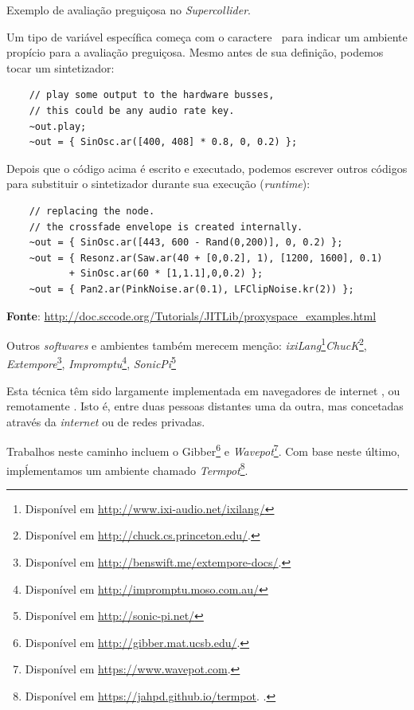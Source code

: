\begin{example}{Exemplo de avaliação preguiçosa no \emph{Supercollider}.}

Um tipo de variável específica começa com o caractere $~$ para indicar um ambiente propício para a avaliação preguiçosa. Mesmo antes de sua definição, podemos tocar um sintetizador:

  \begin{verbatim}
    // play some output to the hardware busses,
    // this could be any audio rate key.
    ~out.play;
    ~out = { SinOsc.ar([400, 408] * 0.8, 0, 0.2) };
  \end{verbatim}

Depois que o código acima é escrito e executado, podemos escrever outros códigos para substituir o sintetizador durante sua execução (\emph{runtime}):
  
  \begin{verbatim}
    // replacing the node. 
    // the crossfade envelope is created internally.
    ~out = { SinOsc.ar([443, 600 - Rand(0,200)], 0, 0.2) };
    ~out = { Resonz.ar(Saw.ar(40 + [0,0.2], 1), [1200, 1600], 0.1) 
           + SinOsc.ar(60 * [1,1.1],0,0.2) };
    ~out = { Pan2.ar(PinkNoise.ar(0.1), LFClipNoise.kr(2)) };
  \end{verbatim}
    
  \textbf{Fonte}: \url{http://doc.sccode.org/Tutorials/JITLib/proxyspace_examples.html}
\label{cod:proxy}
\end{example}

Outros \emph{softwares} e ambientes também merecem menção: \emph{ixiLang}\footnote{Disponível em \url{http://www.ixi-audio.net/ixilang/}}\emph{ChucK}\footnote{Disponível em \url{http://chuck.cs.princeton.edu/}.}, \emph{Extempore}\footnote{Disponível em \url{http://benswift.me/extempore-docs/}.}, \emph{Impromptu}\footnote{Disponível em \url{http://impromptu.moso.com.au/}}, \emph{SonicPi}\footnote{Disponível em \url{http://sonic-pi.net/}}

Esta técnica têm sido largamente implementada em navegadores de internet \cite{roberts_web_2013}, ou remotamente \cite{junior_supercopair_2015}. Isto é, entre duas pessoas distantes uma da outra, mas concetadas através da \emph{internet} ou de redes privadas.

Trabalhos neste caminho incluem o Gibber\footnote{Disponível em \url{http://gibber.mat.ucsb.edu/}. } e \emph{Wavepot}\footnote{Disponível em \url{https://www.wavepot.com}.}. Com base neste último, impĺementamos um ambiente chamado \emph{Termpot}\footnote{Disponível em \url{https://jahpd.github.io/termpot}. .}.